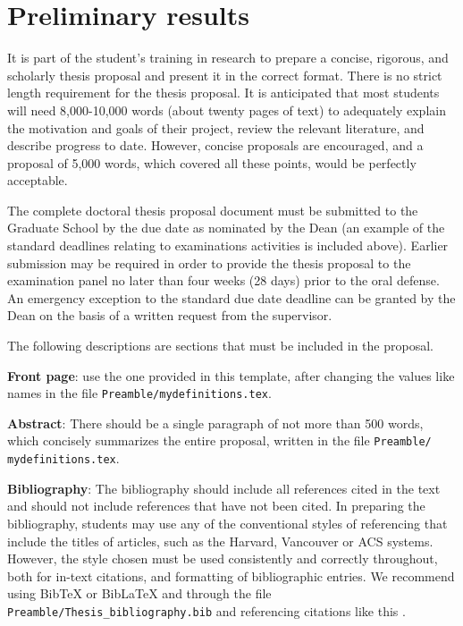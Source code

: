 
\chapter{Preliminary results} \label{ch-5}

It is part of the student's training in research to prepare a concise, rigorous, and scholarly thesis proposal and present it in the correct format. There is no strict length requirement for the thesis proposal. It is anticipated that most students will need 8,000-10,000 words (about twenty pages of text) to adequately explain the motivation and goals of their project, review the relevant literature, and describe progress to date. However, concise proposals are encouraged, and a proposal of 5,000 words, which covered all these points, would be perfectly acceptable. 

The complete doctoral thesis proposal document must be submitted to the Graduate School by the due date as nominated by the Dean (an example of the standard deadlines relating to examinations activities is included above). Earlier submission may be required in order to provide the thesis proposal to the examination panel no later than four weeks (28 days) prior to the oral defense. An emergency exception to the standard due date deadline can be granted by the Dean on the basis of a written request from the supervisor.

The following descriptions are sections that must be included in the proposal.

\textbf{Front page}: use the one provided in this template, after changing the values like names in the file \texttt{Preamble/mydefinitions.tex}.

\textbf{Abstract}: There should be a single paragraph of not more than 500 words, which concisely summarizes the entire proposal, written in the file \texttt{Preamble/ mydefinitions.tex}.

\textbf{Bibliography}: The bibliography should include all references cited in the text and should not include references that have not been cited. In preparing the bibliography, students may use any of the conventional styles of referencing that include the titles of articles, such as the Harvard, Vancouver or ACS systems. However, the style chosen must be used consistently and correctly throughout, both for in-text citations, and formatting of bibliographic entries. We recommend using BibTeX or BibLaTeX and through the file \texttt{Preamble/Thesis\_bibliography.bib} and referencing citations like this \cite{Lee98, Muc10, Kra27}. 

